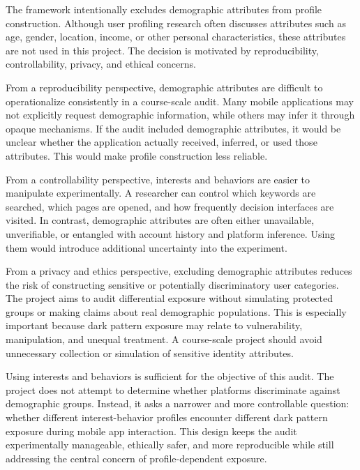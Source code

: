 The framework intentionally excludes demographic attributes from profile construction. Although user profiling research often discusses attributes such as age, gender, location, income, or other personal characteristics, these attributes are not used in this project. The decision is motivated by reproducibility, controllability, privacy, and ethical concerns.

From a reproducibility perspective, demographic attributes are difficult to operationalize consistently in a course-scale audit. Many mobile applications may not explicitly request demographic information, while others may infer it through opaque mechanisms. If the audit included demographic attributes, it would be unclear whether the application actually received, inferred, or used those attributes. This would make profile construction less reliable.

From a controllability perspective, interests and behaviors are easier to manipulate experimentally. A researcher can control which keywords are searched, which pages are opened, and how frequently decision interfaces are visited. In contrast, demographic attributes are often either unavailable, unverifiable, or entangled with account history and platform inference. Using them would introduce additional uncertainty into the experiment.

From a privacy and ethics perspective, excluding demographic attributes reduces the risk of constructing sensitive or potentially discriminatory user categories. The project aims to audit differential exposure without simulating protected groups or making claims about real demographic populations. This is especially important because dark pattern exposure may relate to vulnerability, manipulation, and unequal treatment. A course-scale project should avoid unnecessary collection or simulation of sensitive identity attributes.

Using interests and behaviors is sufficient for the objective of this audit. The project does not attempt to determine whether platforms discriminate against demographic groups. Instead, it asks a narrower and more controllable question: whether different interest-behavior profiles encounter different dark pattern exposure during mobile app interaction. This design keeps the audit experimentally manageable, ethically safer, and more reproducible while still addressing the central concern of profile-dependent exposure.
